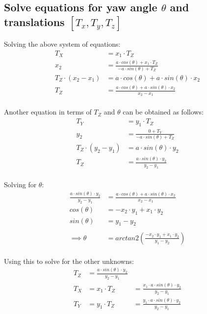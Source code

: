 \documentclass[12pt, oneside]{article}
\begin{document}
\subsection{Solve equations for yaw angle $\theta$ and translations 
$[T_x, T_y, T_z]$}

Solving the above system of equations:
\begin{align*}
T_X &= x_1 \cdot {T_Z}  \\
x_2 &= \frac{a \cdot cos(\theta) + x_1 \cdot {T_Z}}{-a \cdot sin(\theta) + T_Z} \\
T_Z \cdot (x_2 - x_1) &= a \cdot cos(\theta) + a \cdot sin(\theta) \cdot x_2 \\
T_Z &= \frac{a \cdot cos(\theta) + a \cdot sin(\theta) \cdot x_2}{x_2 - x_1} \\
\end{align*}

Another equation in terms of $T_Z$ and $\theta$ can be obtained as follows:
\begin{align*}
T_Y &= y_1 \cdot {T_Z}  \\
y_2 &= \frac{0 + T_Y}{-a \cdot sin(\theta) + T_Z} \\
T_Z \cdot (y_2 - y_1) &= a \cdot sin(\theta) \cdot y_2 \\
T_Z &= \frac{a \cdot sin(\theta) \cdot y_2}{y_2 - y_1} \\
\end{align*}

Solving for $\theta$:
\begin{align*}
\frac{a \cdot sin(\theta) \cdot y_2}{y_2 - y_1}
&= \frac{a \cdot cos(\theta) + a \cdot sin(\theta) \cdot x_2}{x_2 - x_1} \\
cos(\theta) &= -x_2 \cdot y_1 + x_1 \cdot y_2 \\
sin(\theta) &= y_1 - y_2  \\ \\
\implies \theta &= arctan2 \left( 
    \frac{-x_2 \cdot y_1 + x_1 \cdot y_2}{y_1 - y_2}
    \right) \\
\end{align*}

Using this to solve for the other unknowns:
\begin{align*}
    T_Z &= \frac{a \cdot sin(\theta) \cdot y_2}{y_2 - y_1} \\
    T_X &= x_1 \cdot {T_Z}  
        &= \frac{x_1 \cdot a \cdot sin(\theta) \cdot y_2}{y_2 - y_1} \\
    T_Y &= y_1 \cdot {T_Z}  
        &= \frac{y_1 \cdot a \cdot sin(\theta) \cdot y_2}{y_2 - y_1}\\
\end{align*}
\end{document}

